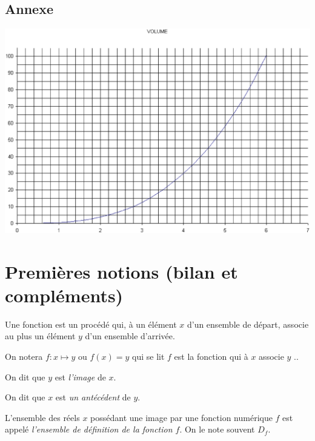 \subsection{Annexe}


\begin{center}
\includegraphics[scale=0.625]{./Graphiques/courbe.eps}\end{center}



 \sautpage

\section{Premi\`eres notions (bilan et compl\'ements)}

\begin{definition}
Une fonction est un proc\'ed\'e qui, \`a un \'el\'ement $x$ d'un ensemble de d\'epart, associe au plus un \'el\'ement $y$ d'un ensemble d'arriv\'ee.

On notera $f:x\mapsto y$ ou $f(x)=y$ qui se lit \og $f$ est la fonction qui \`a $x$ associe $y$ \fg..

On dit que $y$ est \emph{l'image} de $x$.

On dit que $x$ est \emph{un ant\'ec\'edent} de $y$.

\end{definition}

\begin{definition}
L'ensemble des r\'eels $x$ poss\'edant une image par une fonction num\'erique $f$ est appel\'e \emph{l'ensemble de d\'efinition de la fonction $f$}. On le note souvent $D_f$.
\end{definition}

